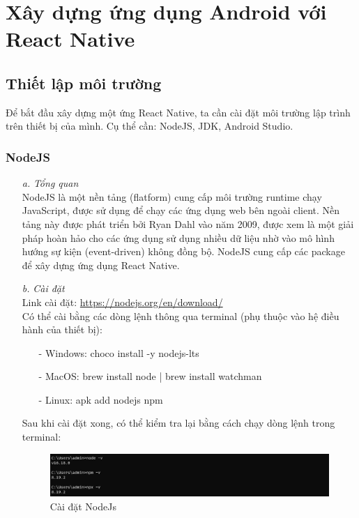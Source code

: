 \section{Xây dựng ứng dụng Android với React Native}

\subsection{Thiết lập môi trường}
Để bắt đầu xây dựng một ứng React Native, ta cần cài đặt môi trường lập trình trên thiết bị của mình. Cụ thể cần: NodeJS, JDK, Android Studio.
\subsubsection{NodeJS}
\begin{enumerate}
    \item[\textit{a.}] {\textit{Tổng quan}}\\
    NodeJS là một nền tảng (flatform) cung cấp môi trường runtime chạy JavaScript, được sử dụng để chạy các ứng dụng web bên ngoài client. Nền tảng này được phát triển bởi Ryan Dahl vào năm 2009, được xem là một giải pháp hoàn hảo cho các ứng dụng sử dụng nhiều dữ liệu nhờ vào mô hình hướng sự kiện (event-driven) không đồng bộ.
    NodeJS cung cấp các package để xây dựng ứng dụng React Native.
    \item[\textit{b.}] {\textit{Cài đặt}}\\
    Link cài đặt: \url{https://nodejs.org/en/download/}\\
    Có thể cài bằng các dòng lệnh thông qua terminal (phụ thuộc vào hệ điều hành của thiết bị):
    \begin{enumerate}
        \item[-] {Windows}: choco install -y nodejs-lts
        \item[-] {MacOS}: brew install node | brew install watchman
        \item[-] {Linux}: apk add nodejs npm
    \end{enumerate}
    Sau khi cài đặt xong, có thể kiểm tra lại bằng cách chạy dòng lệnh trong terminal:
    \begin{figure}[!ht]
        \centering
        \includegraphics[width=1\textwidth]{images/checkNodeJS.png}
        \caption{Cài đặt NodeJs}
    \end{figure}
\end{enumerate}
